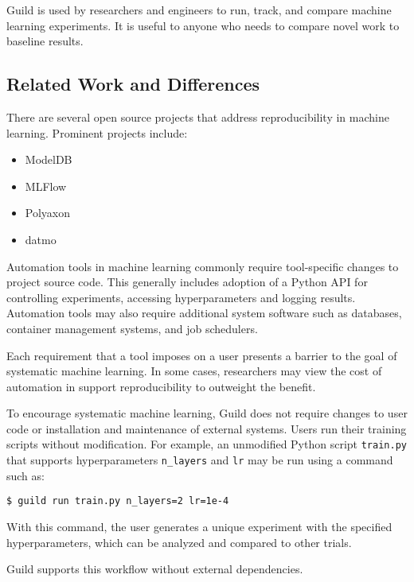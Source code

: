 \documentclass{article}
\begin{document}
Guild is used by researchers and engineers to run, track, and compare
machine learning experiments. It is useful to anyone who needs to
compare novel work to baseline results.

\subsection{Related Work and Differences}

There are several open source projects that address reproducibility in
machine learning. Prominent projects include:

\begin{itemize}[noitemsep, topsep=0pt, partopsep=0pt]
\item ModelDB \cite{modeldb}
\item MLFlow \cite{mlflow}
\item Polyaxon \cite{polyaxon}
\item datmo \cite{datmo}
\end{itemize}

Automation tools in machine learning commonly require tool-specific
changes to project source code. This generally includes adoption of a
Python API for controlling experiments, accessing hyperparameters and
logging results. Automation tools may also require additional system
software such as databases, container management systems, and job
schedulers.

Each requirement that a tool imposes on a user presents a barrier to
the goal of systematic machine learning. In some cases, researchers
may view the cost of automation in support reproducibility to
outweight the benefit.

To encourage systematic machine learning, Guild does not require
changes to user code or installation and maintenance of external
systems. Users run their training scripts without modification. For
example, an unmodified Python script \texttt{train.py} that supports
hyperparameters \texttt{n\_layers} and \texttt{lr} may be run using a
command such as:

{\footnotesize
\begin{verbatim}
$ guild run train.py n_layers=2 lr=1e-4
\end{verbatim}}

With this command, the user generates a unique experiment with the
specified hyperparameters, which can be analyzed and compared to other
trials.

Guild supports this workflow without external dependencies.
\end{document}
